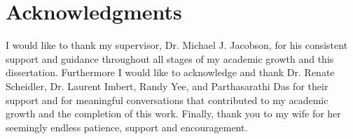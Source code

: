 

  
\chapter{Acknowledgments}

I would like to thank my supervisor, Dr. Michael J. Jacobson, for his consistent support
and guidance throughout all stages of my academic growth and this dissertation.
Furthermore I would like to acknowledge and thank Dr. Renate Scheidler, Dr. Laurent Imbert, 
Randy Yee, and Parthasarathi Das for their support and for meaningful
conversations that contributed to my academic growth and the completion of this
work. Finally, thank you to my wife for her seemingly endless patience, support
and encouragement. 

\tableofcontents


\listoftables

\listofalgorithms


